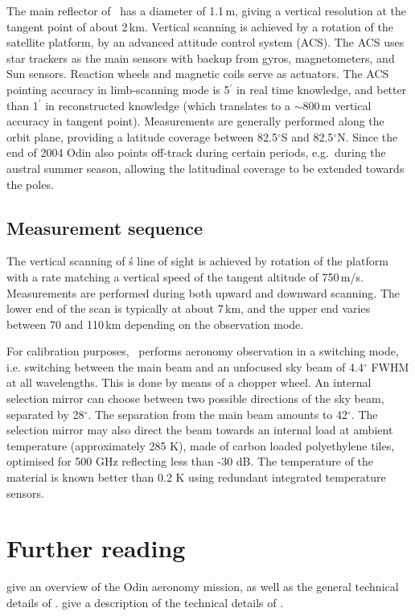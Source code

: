 The main reflector of \smr\ has a diameter of 1.1\,m, giving a
vertical resolution at the tangent point of about 2\,km. 
Vertical scanning is achieved by a rotation of the satellite
platform, by an advanced attitude control system (ACS). 
The ACS uses star trackers as the main sensors with backup from gyros, 
magnetometers, and Sun sensors. Reaction wheels and magnetic coils serve as 
actuators. The ACS pointing accuracy in limb-scanning mode is 5\(^{'}\) in
real time knowledge, and better than 1\(^{'}\) in reconstructed knowledge
(which translates to a \(\sim\)800\,m vertical accuracy in tangent point).
Measurements are generally performed along the orbit plane, providing a
latitude coverage between 82.5$^{\circ}$S and 82.5$^{\circ}$N. Since the end of
2004 Odin also points off-track during certain periods, e.g.\ during the
austral summer season, allowing the latitudinal coverage to be extended towards
the poles. 




\subsection{Measurement sequence}


The vertical scanning of \smr\'s line of sight is achieved by
rotation of the platform with a rate matching a vertical speed of
the tangent altitude of 750\,m/s. Measurements are performed during
both upward and downward scanning. The lower end of the scan is typically
at about 7\,km, and the upper end varies between 70 and 110\,km depending on
the observation mode.

For calibration purposes, \smr\ performs aeronomy observation
in a switching mode, i.e. switching between the main beam and
an unfocused sky beam of 4.4$^{\circ}$ FWHM at all wavelengths. This is done
by means of a chopper wheel. An internal selection mirror
can choose between two possible directions of the sky beam,
separated by 28$^{\circ}$. The separation from the main beam
amounts to 42$^{\circ}$.
The selection mirror may also direct the beam towards an internal
load at ambient temperature (approximately 285 K), made of carbon 
loaded polyethylene  tiles, optimised for 500 GHz reflecting less than -30 dB. 
The temperature of the material is known better than 0.2 K using 
redundant integrated temperature sensors.



\section{Further reading}
\label{sec:reading}

\citet{murtagh:anove:02} give an overview of the Odin aeronomy mission, as well
as the general technical details of \smr. \citet{frisk:theod:03} give a description
of the technical details of \smr.


